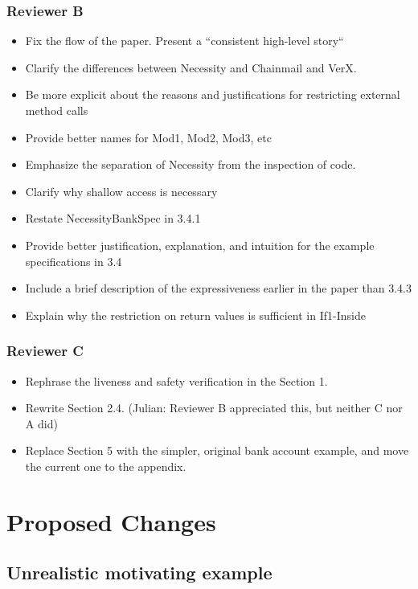\documentclass[11pt]{amsart}
\begin{document}
\subsubsection*{Reviewer B}
\begin{itemize}
\item Fix the flow of the paper. Present a ``consistent high-level story``
\item Clarify the differences between Necessity and Chainmail and VerX.
\item Be more explicit about the reasons and justifications for restricting external method calls
\item Provide better names for Mod1, Mod2, Mod3, etc
\item Emphasize the separation of Necessity from the inspection of code.
\item Clarify why shallow access is necessary
\item Restate NecessityBankSpec in 3.4.1
\item Provide better justification, explanation, and intuition for the example specifications in 3.4
\item Include a brief description of the expressiveness earlier in the paper than 3.4.3
\item Explain why the restriction on return values is sufficient in If1-Inside
\end{itemize}

\subsubsection*{Reviewer C}
\begin{itemize}
\item Rephrase the liveness and safety verification in the Section 1.
\item Rewrite Section 2.4. (Julian: Reviewer B appreciated this, but neither C nor A did)
\item Replace Section 5 with the simpler, original bank account example, and move the current one to the appendix.
\end{itemize}


  
\section{Proposed Changes}

\subsection{Unrealistic motivating example}
\end{document}
